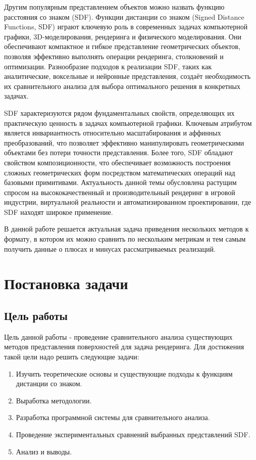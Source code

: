 \documentclass[a4paper,hidelinks,12pt]{article}
\begin{document}
\par
Другим популярным представлением объектов можно назвать функцию расстояния со знаком (SDF). Функции дистанции со знаком 
(Signed Distance Functions, SDF) играют ключевую роль в современных задачах компьютерной графики, 3D-моделирования, рендеринга и 
физического моделирования. Они обеспечивают компактное и гибкое представление геометрических объектов, позволяя эффективно выполнять 
операции рендеринга, столкновений и оптимизации. Разнообразие подходов к реализации SDF, таких как аналитические, воксельные и 
нейронные представления, создаёт необходимость их сравнительного анализа для выбора оптимального решения в конкретных задачах. 
\par
SDF характеризуются рядом фундаментальных свойств, определяющих их практическую ценность в задачах компьютерной графики. 
Ключевым атрибутом является инвариантность относительно масштабирования и аффинных преобразований, что позволяет эффективно 
манипулировать геометрическими объектами без потери точности представления. Более того, SDF обладают свойством композиционности, 
что обеспечивает возможность построения сложных геометрических форм посредством математических операций над базовыми примитивами. Актуальность данной темы обусловлена растущим спросом на высококачественный и производительный рендеринг в игровой индустрии, 
виртуальной реальности и автоматизированном проектировании, где SDF находят широкое применение. 
\par 
В данной работе решается актуальная задача приведения нескольких методов к формату, в котором их можно сравнить по нескольким метрикам и тем самым получить
данные о плюсах и минусах рассматриваемых реализаций.

\newpage

\section{Постановка задачи}

\subsection{Цель работы}
Цель данной работы - проведение сравнительного анализа существующих методов представления поверхностей для задача рендеринга. Для достижения такой цели надо решить следующие задачи:

\begin{enumerate}
	\item Изучить теоретические основы и существующие подходы к функциям дистанции со знаком.
	\item Выработка методологии.
	\item Разработка программной системы для сравнительного анализа.
	\item Проведение экспериментальных сравнений выбранных представлений SDF.
	\item Анализ и выводы.
\end{enumerate}
\end{document}
